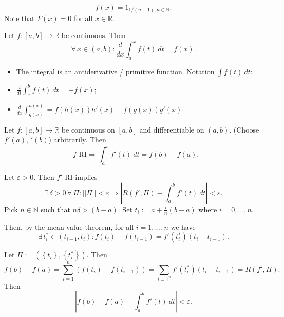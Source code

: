 \documentclass{notes}
\begin{document}
  \begin{eg}
    \[
      f(x) = 1_{1 / (n + 1), n \in \mathbb N}.
    \]
    Note that $F(x) = 0$ for all $x \in \mathbb R$.
  \end{eg}
  
  \begin{cor}
    Let $f \colon [a, b] \to \mathbb R$ be continuous.
    Then 
    \[
      \forall \, x \in (a, b): \frac{d}{dx} \int_a^x f(t)\ dt = f(x).
    \]
  \end{cor}
  
  \begin{note}
    \begin{itemize}
      \item The integral is an antiderivative / primitive function.
      Notation $\int f(t)\ dt$; 
  
      \item $\frac{d}{dt} \int_x^b f(t)\ dt = - f(x)$; 
      
      \item $\frac{d}{dx} \int_{g(x)}^{h(x)} = f(h(x)) h'(x) - f(g(x)) g'(x)$.
    \end{itemize}
  \end{note}
  
  \begin{thm}
    Let $f \colon [a, b]\to \mathbb R$ be continuous on $[a, b]$ and differentiable on $(a, b)$.
    (Choose $f'(a)$, $'(b)$) arbitrarily.
    Then 
    \[
      \text{ $f$ RI} \Rightarrow \int_a^b f'(t)\ dt = f(b) - f(a).
    \]
  \end{thm}
  
  \begin{prf}
    Let $\varepsilon > 0$.
    Then $f'$ RI implies 
    \[
      \exists \, \delta > 0 \, \forall \, \Pi: ||\Pi|| < \varepsilon \Rightarrow \left | R(f', \Pi) - \int_a^b f'(t)\ dt \right | < \varepsilon.
    \]
    Pick $n \in \mathbb N$ such that $n \delta > (b - a)$.
    Set $t_i := a + \frac{i}{n} (b - a)$ where $i = 0, \dots, n$.

    Then, by the mean value theorem, for all $i = 1, \dots, n$ we have 
    \[
      \exists \, t_i^* \in (t_{i - 1}, t_i): f(t_i) - f(t_{i - 1}) = f'(t_i^*) (t_i - t_{i - 1}).
    \]
    
    Let $\Pi := (\left \{ t_i \right \}, \left \{ t_i^* \right \})$.
    Then 
    \[
      f(b) - f(a) = \sum_{i = 1}^n (f(t_i) - f(t_{i - 1})) = \sum_{i = 1^n} f'(t_i^*) (t_i - t_{i - 1}) = R(f', \Pi).
    \]
    Then 
    \[
      \left | f(b) - f(a) - \int_a^b f'(t)\ dt \right | < \varepsilon.
    \]
  \end{prf}
  
\end{document}
